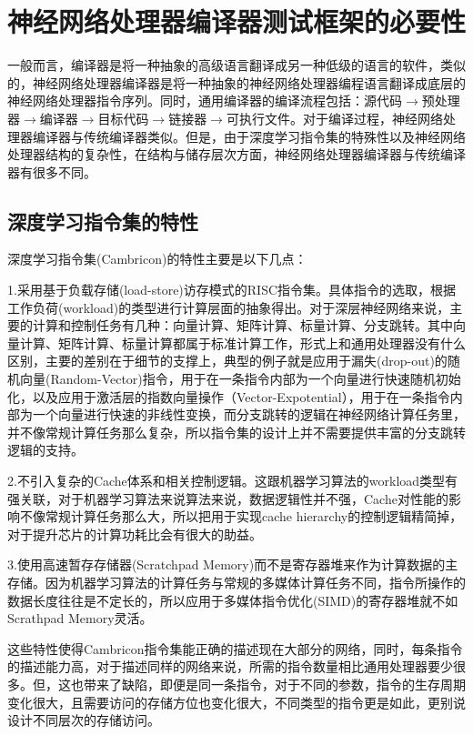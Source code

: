 \section{神经网络处理器编译器测试框架的必要性}

一般而言，编译器是将一种抽象的高级语言翻译成另一种低级的语言的软件，类似的，神经网络处理器编译器是将一种抽象的神经网络处理器编程语言翻译成底层的神经网络处理器指令序列。同时，通用编译器的编译流程包括：源代码$\rightarrow$预处理器$\rightarrow$编译器$\rightarrow$目标代码$\rightarrow$链接器$\rightarrow$可执行文件。对于编译过程，神经网络处理器编译器与传统编译器类似。但是，由于深度学习指令集的特殊性以及神经网络处理器结构的复杂性，在结构与储存层次方面，神经网络处理器编译器与传统编译器有很多不同。

\subsection{深度学习指令集的特性}
深度学习指令集(Cambricon)的特性主要是以下几点：

1.采用基于负载存储(load-store)访存模式的RISC指令集。具体指令的选取，根据工作负荷(workload)的类型进行计算层面的抽象得出。对于深层神经网络来说，主要的计算和控制任务有几种：向量计算、矩阵计算、标量计算、分支跳转。其中向量计算、矩阵计算、标量计算都属于标准计算工作，形式上和通用处理器没有什么区别，主要的差别在于细节的支撑上，典型的例子就是应用于漏失(drop-out)的随机向量(Random-Vector)指令，用于在一条指令内部为一个向量进行快速随机初始化，以及应用于激活层的指数向量操作（Vector-Expotential），用于在一条指令内部为一个向量进行快速的非线性变换，而分支跳转的逻辑在神经网络计算任务里，并不像常规计算任务那么复杂，所以指令集的设计上并不需要提供丰富的分支跳转逻辑的支持。

2.不引入复杂的Cache体系和相关控制逻辑。这跟机器学习算法的workload类型有强关联，对于机器学习算法来说算法来说，数据逻辑性并不强，Cache对性能的影响不像常规计算任务那么大，所以把用于实现cache hierarchy的控制逻辑精简掉，对于提升芯片的计算功耗比会有很大的助益。

3.使用高速暂存存储器(Scratchpad Memory)而不是寄存器堆来作为计算数据的主存储。因为机器学习算法的计算任务与常规的多媒体计算任务不同，指令所操作的数据长度往往是不定长的，所以应用于多媒体指令优化(SIMD)的寄存器堆就不如Scrathpad Memory灵活。

这些特性使得Cambricon指令集能正确的描述现在大部分的网络，同时，每条指令的描述能力高，对于描述同样的网络来说，所需的指令数量相比通用处理器要少很多。但，这也带来了缺陷，即便是同一条指令，对于不同的参数，指令的生存周期变化很大，且需要访问的存储方位也变化很大，不同类型的指令更是如此，更别说设计不同层次的存储访问。

